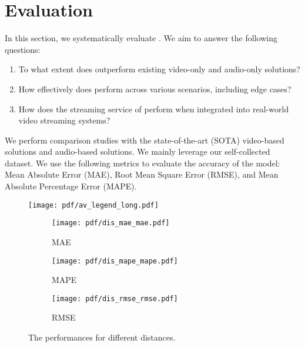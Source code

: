 \section{Evaluation}
\label{sec:evaluation}
In this section, we systematically evaluate \sysname. We aim to answer the following questions:
\begin{enumerate}
    \item To what extent does \sysname outperform existing video-only and audio-only solutions?
    \item How effectively does \sysname perform across various scenarios, including edge cases?
    \item How does the streaming service of \sysname perform when integrated into real-world video streaming systems?
\end{enumerate}

We perform comparison studies with the state-of-the-art (SOTA) video-based solutions and audio-based solutions. We mainly leverage our self-collected dataset. We use the following metrics to evaluate the accuracy of the model: Mean Absolute Error (MAE), Root Mean Square Error (RMSE), and Mean Absolute Percentage Error (MAPE).

\begin{figure*}[t]
    \centering

    \begin{minipage}{\linewidth}
        \centering
        \texttt{[image: pdf/av\_legend\_long.pdf]}
    \end{minipage}

    \begin{minipage}{\linewidth}
        \begin{subfigure}{.32\linewidth}
            \texttt{[image: pdf/dis\_mae\_mae.pdf]}
            \caption{MAE}
            \label{subfig:dis_mae}
        \end{subfigure}\hfill
        \begin{subfigure}{.32\linewidth}
            \texttt{[image: pdf/dis\_mape\_mape.pdf]}
            \caption{MAPE}
            \label{subfig:dis_mape}
        \end{subfigure}\hfill
        \begin{subfigure}{.32\linewidth}
            \texttt{[image: pdf/dis\_rmse\_rmse.pdf]}
            \caption{RMSE}
            \label{subfig:dis_rmse}
        \end{subfigure}
    \end{minipage}
    \caption{The performances for different distances.}
    \label{fig: res_dis}
\end{figure*}

